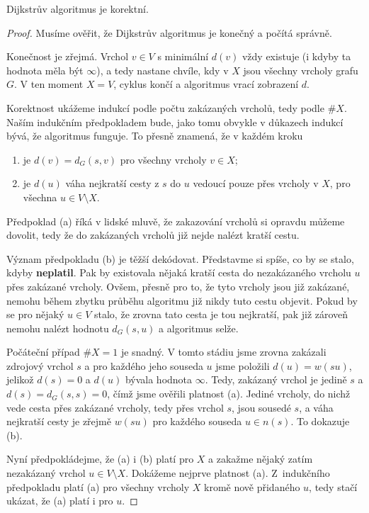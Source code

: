 \begin{claim}
 \label{claim:dijsktra-korektni}
 Dijkstrův algoritmus je korektní.
\end{claim}
\begin{proof}
 Musíme ověřit, že Dijkstrův algoritmus je konečný a počítá správně.

 Konečnost je zřejmá. Vrchol $v \in V$ s minimální $d(v)$ vždy existuje (i kdyby
 ta hodnota měla být $\infty$), a tedy nastane chvíle, kdy v $X$ jsou všechny
 vrcholy grafu $G$. V ten moment $X = V$, cyklus končí a algoritmus vrací
 zobrazení $d$.
 
 Korektnost ukážeme indukcí podle počtu zakázaných vrcholů, tedy podle $\# X$.
 Naším indukčním předpokladem bude, jako tomu obvykle v důkazech indukcí bývá,
 že algoritmus funguje. To přesně znamená, že v každém kroku
 \begin{enumerate}[label=(\alph*)]
  \item je $d(v) = d_G(s,v)$ pro všechny vrcholy $v \in X$;
  \item je $d(u)$ váha nejkratší cesty z $s$ do $u$ vedoucí pouze přes vrcholy v
   $X$, pro všechna $u \in V \setminus X$.
 \end{enumerate}
 Předpoklad (a) říká v lidské mluvě, že zakazování vrcholů si opravdu můžeme
 dovolit, tedy že do zakázaných vrcholů již nejde nalézt kratší cestu.

 Význam předpokladu (b) je těžší dekódovat. Představme si spíše, co by se stalo,
 kdyby \textbf{neplatil}. Pak by existovala nějaká kratší cesta do nezakázaného
 vrcholu $u$ přes zakázané vrcholy. Ovšem, přesně pro to, že tyto vrcholy jsou
 již zakázané, nemohu během zbytku průběhu algoritmu již nikdy tuto cestu
 objevit. Pokud by se pro nějaký $u \in V$ stalo, že zrovna tato cesta je tou
 nejkratší, pak již zároveň nemohu nalézt hodnotu $d_G(s,u)$ a algoritmus selže.

 Počáteční případ $\# X = 1$ je snadný. V tomto stádiu jsme zrovna zakázali
 zdrojový vrchol $s$ a pro každého jeho souseda $u$ jsme položili $d(u) =
 w(su)$, jelikož $d(s) = 0$ a $d(u)$ bývala hodnota $\infty$. Tedy, zakázaný
 vrchol je jedině $s$ a $d(s) = d_G(s,s) = 0$, čímž jsme ověřili platnost (a).
 Jediné vrcholy, do nichž vede cesta přes zakázané vrcholy, tedy přes vrchol
 $s$, jsou sousedé $s$, a váha nejkratší cesty je zřejmě $w(su)$ pro každého
 souseda $u \in n(s)$. To dokazuje (b).

 Nyní předpokládejme, že (a) i (b) platí pro $X$ a zakažme nějaký zatím
 nezakázaný vrchol $u \in V \setminus X$. Dokážeme nejprve platnost (a).
 Z~indukčního předpokladu platí (a) pro všechny vrcholy $X$ kromě nově přidaného
 $u$, tedy stačí ukázat, že (a) platí i pro $u$.


\end{proof}
